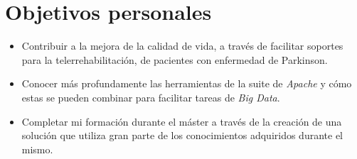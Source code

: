 \section{Objetivos personales}

\begin{itemize}
	\item Contribuir a la mejora de la calidad de vida, a través de facilitar soportes para la telerrehabilitación, de pacientes con enfermedad de Parkinson.
	\item Conocer más profundamente las herramientas de la suite de \textit{Apache} y cómo estas se pueden combinar para facilitar tareas de \textit{Big Data}.
	\item Completar mi formación durante el máster a través de la creación de una solución que utiliza gran parte de los conocimientos adquiridos durante el mismo.
\end{itemize}

